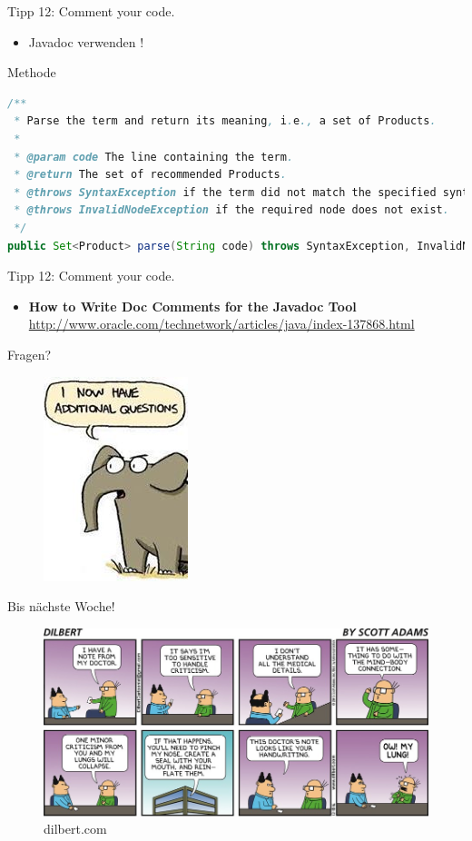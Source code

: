 \documentclass[18pt]{beamer}
\begin{document}
\begin{frame}[fragile]{Tipp 12: Comment your code.}
    \begin{itemize}
        \item Javadoc verwenden !
    \end{itemize}
    \begin{exampleblock}{Methode}
        \begin{lstlisting}[language=Java,basicstyle=\tiny]
/**
 * Parse the term and return its meaning, i.e., a set of Products.
 *
 * @param code The line containing the term.
 * @return The set of recommended Products.
 * @throws SyntaxException if the term did not match the specified syntax rules.
 * @throws InvalidNodeException if the required node does not exist.
 */
public Set<Product> parse(String code) throws SyntaxException, InvalidNodeException { ... }
        \end{lstlisting}
    \end{exampleblock}
\end{frame}

\begin{frame}{Tipp 12: Comment your code.}
    \begin{itemize}
        \item \textbf{How to Write Doc Comments for the Javadoc Tool}\\
        \url{http://www.oracle.com/technetwork/articles/java/index-137868.html}
    \end{itemize}
\end{frame}

\begin{frame}{Fragen?}
    \begin{figure}
        \includegraphics[scale=.6]{img/additionalquestions.jpg}
    \end{figure}
\end{frame}

\begin{frame}{Bis nächste Woche!}
    \begin{figure}
        \includegraphics[scale=2.5]{img/dt161218.jpg}
        \caption{\footnotesize{dilbert.com}}
    \end{figure}
\end{frame}

\backupend
\end{document}
